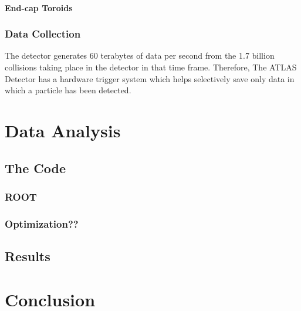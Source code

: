\documentclass[11pt,a4paper]{article}
\begin{document}
\paragraph{End-cap Toroids}

\subsubsection{Data Collection}
The detector generates 60 terabytes of data per second from the 1.7 billion
collisions taking place in the detector in that time frame. Therefore, The ATLAS
Detector has a hardware trigger system which helps selectively save only data in
which a particle has been detected.


\section{Data Analysis}

\subsection{The Code}

\subsubsection{ROOT}

\subsubsection{Optimization??}

\subsection{Results}

\section{Conclusion}

\printbibliography
\end{document}
